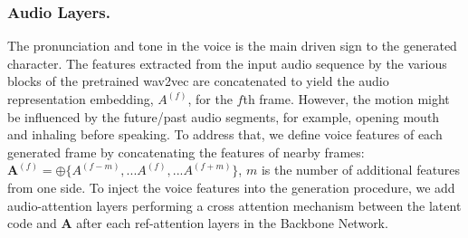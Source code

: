 \subsubsection{Audio Layers.}
\label{sec:audiolayer}
The pronunciation and tone in the voice is the main driven sign to the generated character. The features extracted from the input audio sequence by the various blocks of the pretrained wav2vec\cite{wav2vec} are concatenated to yield the audio representation embedding, $A^{(f)}$, for the $f$th frame. However, the motion might be influenced by the future/past audio segments, for example, opening mouth and inhaling before speaking. To address that, we define voice features of each generated frame by concatenating the features of nearby frames: 
$\mathbf{A}^{(f)}=\oplus\{A^{(f-m)},...A^{(f)},...A^{(f+m)}\}$, $m$  is the number of additional features from one side. To inject the voice features into the generation procedure, we add audio-attention layers performing a cross attention mechanism between the latent code and $\mathbf{A}$ after each ref-attention layers in the Backbone Network. 


